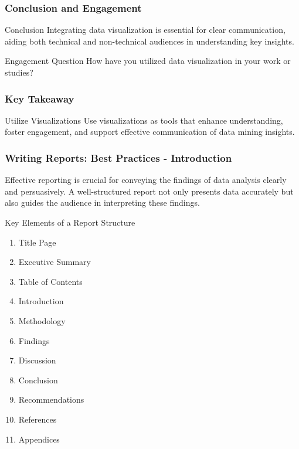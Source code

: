 \documentclass{beamer}
\begin{document}
\begin{frame}[fragile]
    \frametitle{Conclusion and Engagement}
    \begin{block}{Conclusion}
        Integrating data visualization is essential for clear communication, aiding both technical and non-technical audiences in understanding key insights.
    \end{block}
    \vspace{0.5cm}
    \begin{block}{Engagement Question}
        How have you utilized data visualization in your work or studies?
    \end{block}
\end{frame}

\begin{frame}[fragile]
    \frametitle{Key Takeaway}
    \begin{block}{Utilize Visualizations}
        Use visualizations as tools that enhance understanding, foster engagement, and support effective communication of data mining insights.
    \end{block}
\end{frame}

\begin{frame}[fragile]
    \frametitle{Writing Reports: Best Practices - Introduction}
    Effective reporting is crucial for conveying the findings of data analysis clearly and persuasively. A well-structured report not only presents data accurately but also guides the audience in interpreting these findings.

    \begin{block}{Key Elements of a Report Structure}
        \begin{enumerate}
            \item Title Page
            \item Executive Summary
            \item Table of Contents
            \item Introduction
            \item Methodology
            \item Findings
            \item Discussion
            \item Conclusion
            \item Recommendations
            \item References
            \item Appendices
        \end{enumerate}
    \end{block}
\end{frame}
\end{document}

